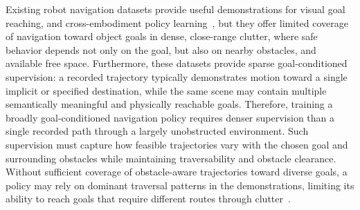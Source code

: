

Existing robot navigation datasets provide useful demonstrations for visual goal reaching, and cross-embodiment policy learning~\cite{karnan2022scand,shah2023gnm,liang2025gndglobalnavigationdataset}, but they offer limited coverage of navigation toward object goals in dense, close-range clutter, where safe behavior depends not only on the goal, but also on nearby obstacles, and available free space. Furthermore, these datasets provide sparse goal-conditioned supervision: a recorded trajectory typically demonstrates motion toward a single implicit or specified destination, while the same scene may contain multiple semantically meaningful and physically reachable goals.
Therefore, training a broadly goal-conditioned navigation policy requires denser supervision than a single recorded path through a largely unobstructed environment. Such supervision must capture how feasible trajectories vary with the chosen goal and surrounding obstacles while maintaining traversability and obstacle clearance.
Without sufficient coverage of obstacle-aware trajectories toward diverse goals, a policy may rely on dominant traversal patterns in the demonstrations, limiting its ability to reach goals that require different routes through clutter~\cite{glossop2025castcounterfactuallabelsimprove, seneviratne2026chop,zhang2025creste}.

